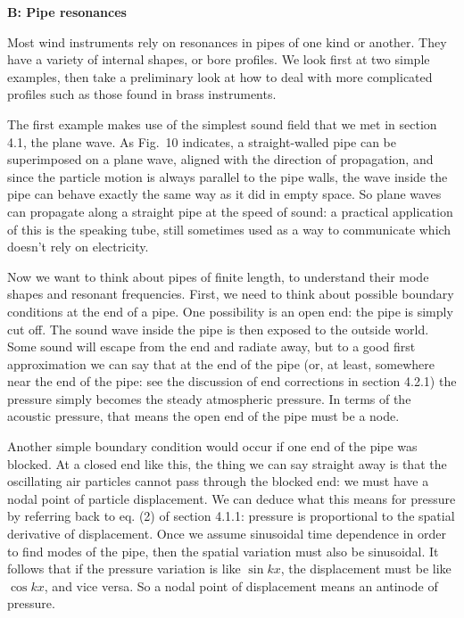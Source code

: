 
  \textbf{B: Pipe resonances} 

  Most wind instruments rely on resonances in pipes of one kind or another. 
  They have a variety of internal shapes, or bore profiles. We look first at 
  two simple examples, then take a preliminary look at how to deal with more 
  complicated profiles such as those found in brass instruments. 

  The first example makes use of the simplest sound field that we met in 
  section 4.1, the plane wave. As Fig.\ 10 indicates, a straight-walled pipe 
  can be superimposed on a plane wave, aligned with the direction of 
  propagation, and since the particle motion is always parallel to the pipe 
  walls, the wave inside the pipe can behave exactly the same way as it did in 
  empty space. So plane waves can propagate along a straight pipe at the speed 
  of sound: a practical application of this is the speaking tube, still 
  sometimes used as a way to communicate which doesn't rely on electricity. 


  Now we want to think about pipes of finite length, to understand their mode 
  shapes and resonant frequencies. First, we need to think about possible 
  boundary conditions at the end of a pipe. One possibility is an open end: the 
  pipe is simply cut off. The sound wave inside the pipe is then exposed to the 
  outside world. Some sound will escape from the end and radiate away, but to a 
  good first approximation we can say that at the end of the pipe (or, at 
  least, somewhere near the end of the pipe: see the discussion of end 
  corrections in section 4.2.1) the pressure simply becomes the steady 
  atmospheric pressure. In terms of the acoustic pressure, that means the open 
  end of the pipe must be a node. 

  Another simple boundary condition would occur if one end of the pipe was 
  blocked. At a closed end like this, the thing we can say straight away is 
  that the oscillating air particles cannot pass through the blocked end: we 
  must have a nodal point of particle displacement. We can deduce what this 
  means for pressure by referring back to eq. (2) of section 4.1.1: pressure is 
  proportional to the spatial derivative of displacement. Once we assume 
  sinusoidal time dependence in order to find modes of the pipe, then the 
  spatial variation must also be sinusoidal. It follows that if the pressure 
  variation is like $\sin kx$, the displacement must be like $\cos kx$, and 
  vice versa. So a nodal point of displacement means an antinode of pressure. 

